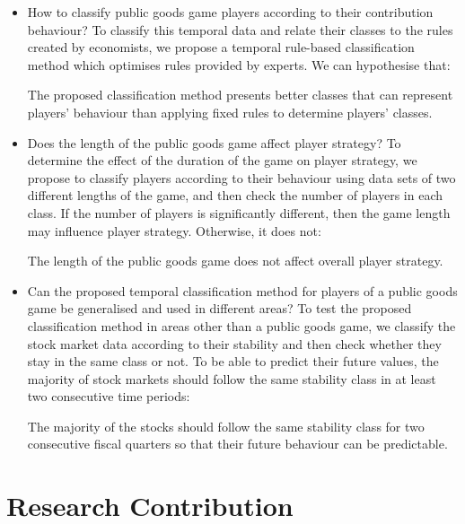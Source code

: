 \begin{itemize}
	\item How to classify public goods game players according to their contribution behaviour? To classify this temporal data and relate their classes to the rules created by economists, we propose a temporal rule-based classification method which optimises rules provided by experts. We can hypothesise that: 
	\begin{hyp} \label{hypo:proposedClassification} 
		The proposed classification method presents better classes that can represent players' behaviour than applying fixed rules to determine players' classes.
	\end{hyp}
	
	\item Does the length of the public goods game affect player strategy? To determine the effect of the duration of the game on player strategy, we propose to classify players according to their behaviour using data sets of two different lengths of the game, and then check the number of players in each class. If the number of players is significantly different, then the game length may influence player strategy. Otherwise, it does not:
	\begin{hyp} \label{hypo:lengthOftheGame} 
		The length of the public goods game does not affect overall player strategy. 
	\end{hyp}
	
	\item Can the proposed temporal classification method for players of a public goods game be generalised and used in different areas? To test the proposed classification method in areas other than a public goods game, we classify the stock market data according to their stability and then check whether they stay in the same class or not. To be able to predict their future values, the majority of stock markets should follow the same stability class in at least two consecutive time periods: 
	\begin{hyp} \label{hypo:pridictabilityOfStocks} 
		The majority of the stocks should follow the same stability class for two consecutive fiscal quarters so that their future behaviour can be predictable. 
	\end{hyp}

\end{itemize}



\section{Research Contribution}


